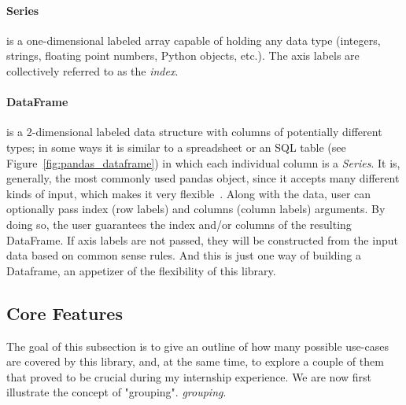 \paragraph{Series} is a one-dimensional labeled array capable of holding any data type (integers, strings, floating point numbers, Python objects, etc.).
The axis labels are collectively referred to as the \textit{index}.

\paragraph{DataFrame} is a 2-dimensional labeled data structure with columns of potentially different types; in some ways it is similar to
a spreadsheet or an SQL table (see Figure~\ref{fig:pandas_dataframe}) in which each individual column is a \textit{Series}.
It is, generally, the most commonly used pandas object, since it accepts many different kinds of input, which makes it very flexible~\cite{reback_pandas-dev/pandas:_2022}.
Along with the data, user
can optionally pass index (row labels) and columns (column labels) arguments. By doing so, the user guarantees the index and/or columns of the resulting DataFrame.
If axis labels are not passed, they will be constructed from the input data based on common sense rules.
And this is just one way of building a Dataframe, an appetizer of the flexibility of this library.

\subsection{Core Features}
The goal
of this subsection is to give an outline of how many possible use-cases are covered by this library, and, at the same time, to explore a couple of them that proved to be crucial during my internship experience.
We are now first illustrate the concept of "grouping". \textit{grouping}.

